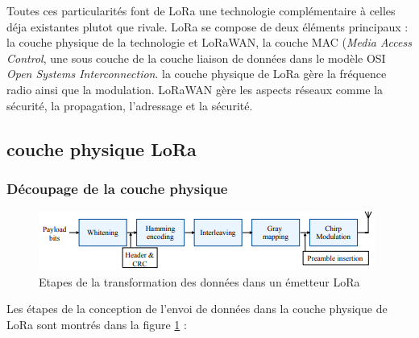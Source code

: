 \vspace{0.1cm}

Toutes ces  particularités font de LoRa une technologie complémentaire à celles déja existantes plutot que rivale.
LoRa se compose de deux éléments principaux : la couche physique de la technologie et LoRaWAN, la couche MAC (\textit{Media Access Control}, une sous couche de la couche liaison de données dans le modèle OSI \textit{Open Systems Interconnection}. la couche physique de LoRa gère la fréquence radio ainsi que la modulation. LoRaWAN gère les aspects réseaux comme la sécurité, la propagation, l'adressage et la sécurité.

\subsection{couche physique LoRa}

\subsubsection{Découpage de la couche physique}

\begin{figure}[h]
\centering

\includegraphics[scale=1]{images/physical_lora_rx.PNG}
\caption{Etapes de la transformation des données dans un émetteur LoRa\cite{loraphy}}\label{term4}
\end{figure}


Les étapes de la conception de l'envoi de données dans la couche physique de LoRa sont montrés dans la figure \ref{term4} :

\vspace{0.1cm}

